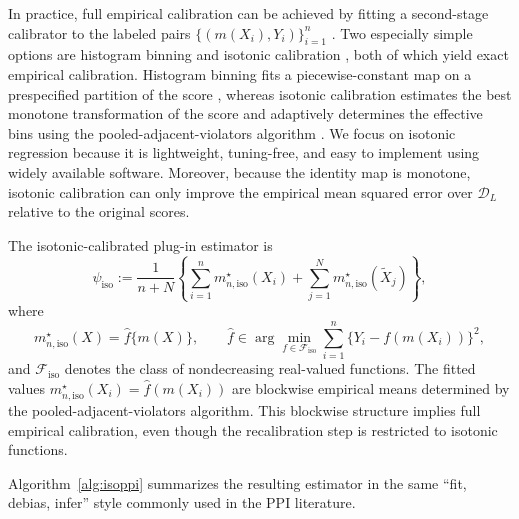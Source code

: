 \documentclass{article}
\theoremstyle{plain}
\theoremstyle{definition}
\newcommand{\1}{\mathbbm{1}}
\newcommand{\mhat}{m}
\begin{document}
In practice, full empirical calibration can be achieved by fitting a second-stage calibrator to the labeled pairs \(\{(\mhat(X_i),Y_i)\}_{i=1}^n\) \citep{van2025venn}. Two especially simple options are histogram binning and isotonic calibration \citep{zadrozny2001obtaining,zadrozny2002transforming,niculescu2005predicting}, both of which yield exact empirical calibration. Histogram binning fits a piecewise-constant map on a prespecified partition of the score \citep{gupta2021distribution}, whereas isotonic calibration estimates the best monotone transformation of the score and adaptively determines the effective bins using the pooled-adjacent-violators algorithm \citep{barlow1972isotonic}. We focus on isotonic regression because it is lightweight, tuning-free, and easy to implement using widely available software. Moreover, because the identity map is monotone, isotonic calibration can only improve the empirical mean squared error over \(\mathcal{D}_L\) relative to the original scores.


The isotonic-calibrated plug-in estimator is
\[
\widehat{\psi}_{\mathrm{iso}}
:=
\frac{1}{n+N}
\left\{
\sum_{i=1}^n m_{n,\mathrm{iso}}^\star(X_i)
+
\sum_{j=1}^N m_{n,\mathrm{iso}}^\star(\widetilde X_j)
\right\},
\]
where
\[
m_{n,\mathrm{iso}}^\star(X)
=
\hat f\{\mhat(X)\},
\qquad
\hat f \in \arg\min_{f \in \mathcal F_{\mathrm{iso}}}
\sum_{i=1}^n \bigl\{Y_i - f(\mhat(X_i))\bigr\}^2,
\]
and \(\mathcal F_{\mathrm{iso}}\) denotes the class of nondecreasing real-valued functions. The fitted values \(m_{n,\mathrm{iso}}^\star(X_i)=\hat f(\mhat(X_i))\) are blockwise empirical means determined by the pooled-adjacent-violators algorithm. This blockwise structure implies full empirical calibration, even though the recalibration step is restricted to isotonic functions.  

Algorithm~\ref{alg:isoppi} summarizes the resulting estimator in the same ``fit, debias, infer'' style commonly used in the PPI literature.
\end{document}
